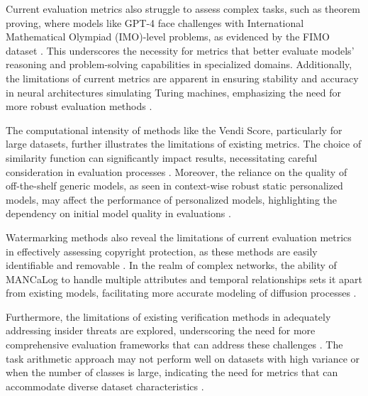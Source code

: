 Current evaluation metrics also struggle to assess complex tasks, such as theorem proving, where models like GPT-4 face challenges with International Mathematical Olympiad (IMO)-level problems, as evidenced by the FIMO dataset \cite{liu2023fimochallengeformaldataset}. This underscores the necessity for metrics that better evaluate models' reasoning and problem-solving capabilities in specialized domains. Additionally, the limitations of current metrics are apparent in ensuring stability and accuracy in neural architectures simulating Turing machines, emphasizing the need for more robust evaluation methods \cite{stogin2022provablystableneuralnetwork}.



The computational intensity of methods like the Vendi Score, particularly for large datasets, further illustrates the limitations of existing metrics. The choice of similarity function can significantly impact results, necessitating careful consideration in evaluation processes \cite{pasarkar2024cousinsvendiscorefamily}. Moreover, the reliance on the quality of off-the-shelf generic models, as seen in context-wise robust static personalized models, may affect the performance of personalized models, highlighting the dependency on initial model quality in evaluations \cite{kaur2024cropcontextwiserobuststatic}.



Watermarking methods also reveal the limitations of current evaluation metrics in effectively assessing copyright protection, as these methods are easily identifiable and removable \cite{wang2024espewrobustcopyrightprotection}. In the realm of complex networks, the ability of MANCaLog to handle multiple attributes and temporal relationships sets it apart from existing models, facilitating more accurate modeling of diffusion processes \cite{shakarian2022reasoningcomplexnetworkslogic}.



Furthermore, the limitations of existing verification methods in adequately addressing insider threats are explored, underscoring the need for more comprehensive evaluation frameworks that can address these challenges \cite{kammller2020applyingisabelleinsiderframework}. The task arithmetic approach may not perform well on datasets with high variance or when the number of classes is large, indicating the need for metrics that can accommodate diverse dataset characteristics \cite{chitale2023taskarithmeticloracontinual}.



